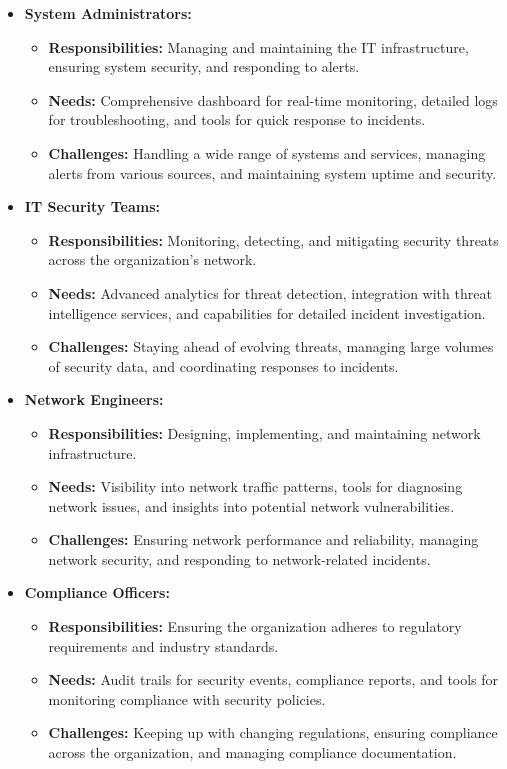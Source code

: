 \documentclass{article}
\begin{document}
    \begin{itemize}
        \item \textbf{System Administrators:}
        \begin{itemize}
            \item \textbf{Responsibilities:} Managing and maintaining the IT infrastructure, ensuring system security, and responding to alerts.
            \item \textbf{Needs:} Comprehensive dashboard for real-time monitoring, detailed logs for troubleshooting, and tools for quick response to incidents.
            \item \textbf{Challenges:} Handling a wide range of systems and services, managing alerts from various sources, and maintaining system uptime and security.
        \end{itemize}

        \item \textbf{IT Security Teams:}
        \begin{itemize}
            \item \textbf{Responsibilities:} Monitoring, detecting, and mitigating security threats across the organization's network.
            \item \textbf{Needs:} Advanced analytics for threat detection, integration with threat intelligence services, and capabilities for detailed incident investigation.
            \item \textbf{Challenges:} Staying ahead of evolving threats, managing large volumes of security data, and coordinating responses to incidents.
        \end{itemize}

        \item \textbf{Network Engineers:}
        \begin{itemize}
            \item \textbf{Responsibilities:} Designing, implementing, and maintaining network infrastructure.
            \item \textbf{Needs:} Visibility into network traffic patterns, tools for diagnosing network issues, and insights into potential network vulnerabilities.
            \item \textbf{Challenges:} Ensuring network performance and reliability, managing network security, and responding to network-related incidents.
        \end{itemize}

        \item \textbf{Compliance Officers:}
        \begin{itemize}
            \item \textbf{Responsibilities:} Ensuring the organization adheres to regulatory requirements and industry standards.
            \item \textbf{Needs:} Audit trails for security events, compliance reports, and tools for monitoring compliance with security policies.
            \item \textbf{Challenges:} Keeping up with changing regulations, ensuring compliance across the organization, and managing compliance documentation.
        \end{itemize}


\end{itemize}
\end{document}
